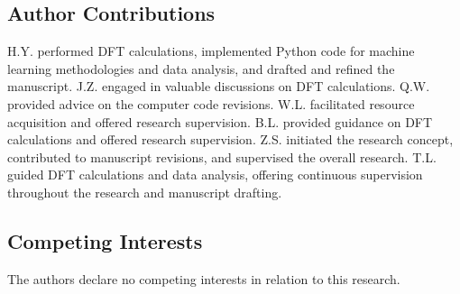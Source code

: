 \subsection{Author Contributions}
H.Y. performed DFT calculations, implemented Python code for machine learning methodologies and data analysis,
and drafted and refined the manuscript.
J.Z. engaged in valuable discussions on DFT calculations.
Q.W. provided advice on the computer code revisions.
W.L. facilitated resource acquisition and offered research supervision.
B.L. provided guidance on DFT calculations and offered research supervision.
Z.S. initiated the research concept, contributed to manuscript revisions, and supervised the overall research.
T.L. guided DFT calculations and data analysis, offering continuous supervision throughout the research and manuscript drafting.


\subsection{Competing Interests}
The authors declare no competing interests in relation to this research.
